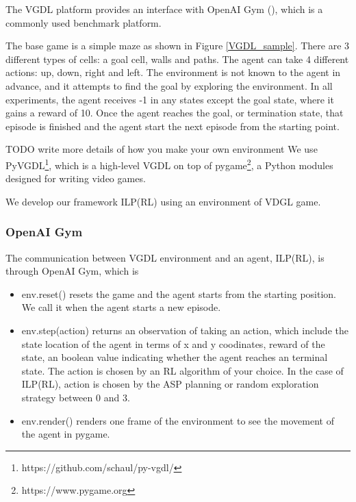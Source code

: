 The VGDL platform provides an interface with OpenAI Gym (\cite{Brockman2016}), which is a commonly used benchmark platform.

The base game is a simple maze as shown in Figure \ref{VGDL_sample}.
There are 3 different types of cells: a goal cell, walls and paths. The agent can take 4 different actions: up, down, right and left.
The environment is not known to the agent in advance, and it attempts to find the goal by exploring the environment.
In all experiments, the agent receives -1 in any states except the goal state, where it gains a reward of 10.
Once the agent reaches the goal, or termination state, that episode is finished and the agent start the next episode from the starting point.

TODO write more details of how you make your own environment
We use PyVGDL\footnote{https://github.com/schaul/py-vgdl/}, which is a high-level VGDL on top of pygame\footnote{https://www.pygame.org}, 
a Python modules designed for writing video games.


We develop our framework ILP(RL) using an environment of VDGL game.

\subsubsection{OpenAI Gym}
The communication between VGDL environment and an agent, ILP(RL), is through OpenAI Gym, which is 



\begin{itemize}
\item \textsf{env.reset()} resets the game and the agent starts from the starting position. We call it when the agent starts a new episode.
\item \textsf{env.step(action)} returns an observation of taking an action, which include the state location of the agent in terms of x and y coodinates, reward of the state, an boolean value indicating whether the agent reaches an terminal state.
The action is chosen by an RL algorithm of your choice. In the case of ILP(RL), action is chosen by the ASP planning or random exploration strategy between 0 and 3.
\item \textsf{env.render()} renders one frame of the environment to see the movement of the agent in pygame.
\end{itemize}

